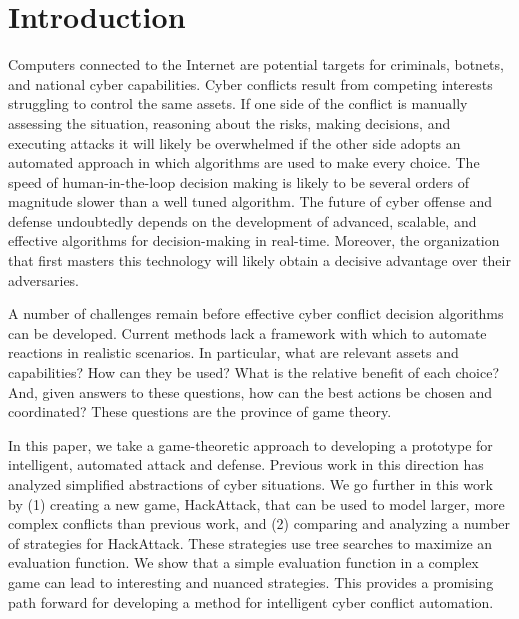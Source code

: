 \documentclass{sig-alternate-05-2015}
\begin{document}


\printccsdesc







\section{Introduction}
\label{sec:intro}
Computers connected to the Internet are potential targets for criminals, botnets, and national cyber capabilities. Cyber conflicts result from competing interests struggling to control the same assets. If one side of the conflict is manually assessing the situation, reasoning about the risks, making decisions, and executing attacks it will likely be overwhelmed if the other side adopts an automated approach in which algorithms are used to make every choice. The speed of human-in-the-loop decision making is likely to be several orders of magnitude slower than a well tuned algorithm. The future of cyber offense and defense undoubtedly depends on the development of advanced, scalable, and effective algorithms for decision-making in real-time. Moreover, the organization that first masters this technology will likely obtain a decisive advantage over their adversaries. 

A number of challenges remain before effective cyber conflict decision algorithms can be developed. Current methods lack a framework with which to automate reactions in realistic scenarios. In particular, what are relevant assets and capabilities? How can they be used? What is the relative benefit of each choice? And, given answers to these questions, how can the best actions be chosen and coordinated? These questions are the province of game theory.

In this paper, we take a game-theoretic approach to developing a prototype for intelligent, automated attack and defense. Previous work in this direction has analyzed simplified abstractions of cyber situations. We go further in this work by (1) creating a new game, HackAttack, that can be used to model larger, more complex conflicts than previous work, and (2) comparing and analyzing a number of strategies for HackAttack. These strategies use tree searches to maximize an evaluation function. We show that a simple evaluation function in a complex game can lead to interesting and nuanced strategies. This provides a promising path forward for developing a method for intelligent cyber conflict automation.
\end{document}
